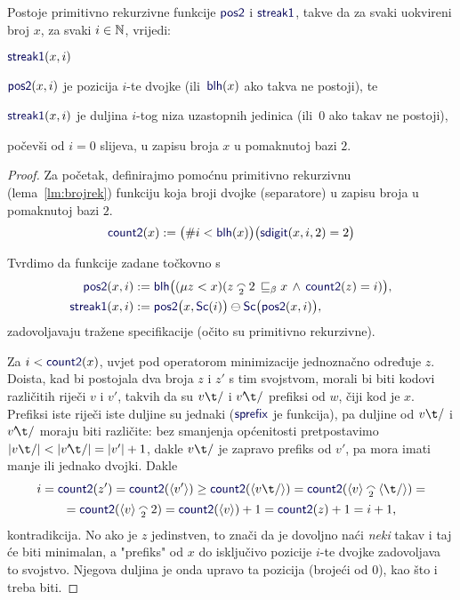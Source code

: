 \begin{lema}[{name=[primitivna rekurzivnost raščlambe binarnih zapisa]}]\label{lm:pos2streak1prn}
Postoje primitivno rekurzivne funkcije $\f{pos2}$ i $\f{streak1}$, takve da za svaki uokvireni broj $x$, za svaki $i\in{\mathbb N}$, vrijedi:
\begin{labeling}{$\f{streak1}(x,i)$}
    \item[$\f{pos2}(x,i)$] je pozicija $i$-te dvojke (ili\, $\f{blh}(x)$ ako takva ne postoji), te
    \item[$\f{streak1}(x,i)$] je duljina $i$-tog niza uzastopnih jedinica (ili\, $0$ ako takav ne postoji),
\end{labeling}
počevši od $i=0$ slijeva, u zapisu broja $x$ u pomaknutoj bazi $2$.
\end{lema}
\begin{proof}
Za početak, definirajmo pomoćnu primitivno rekurzivnu (lema~\ref{lm:brojrek}) funkciju koja broji dvojke (separatore) u zapisu broja u pomaknutoj bazi $2$.
\begin{equation}
    \f{count2}(x):=\bigl(\#i<\f{blh}(x)\bigr)\bigl(\f{sdigit}(x,i,2)=2\bigr)
\end{equation}

Tvrdimo da funkcije zadane točkovno s
\begin{align}
    \f{pos2}(x,i)&:=\f{blh}\bigl((\mu z<x)(z\conc22\,\sqsubseteq_\beta x\,\land\,\f{count2}(z)=i)\bigr),\\
    \f{streak1}(x,i)&:=\f{pos2}\bigl(x,\f{Sc}(i)\bigr)\ominus\f{Sc}\bigl(\f{pos2}(x,i)\bigr),
\end{align}
zadovoljavaju tražene specifikacije (očito su primitivno rekurzivne).

Za $i<\f{count2}(x)$, uvjet pod operatorom minimizacije jednoznačno određuje $z$. Doista, kad bi postojala dva broja $z$ i $z'$ s tim svojstvom, morali bi biti kodovi različitih riječi $v$ i $v'$, takvih da su $v\t/$ i $v'\!\t/$ prefiksi od $w$, čiji kod je $x$. Prefiksi iste riječi iste duljine su jednaki ($\f{sprefix}$ je funkcija), pa duljine od $v\t/$ i $v'\!\t/$ moraju biti različite: bez smanjenja općenitosti pretpostavimo $\dulj{v\t/}<\dulj{v'\!\t/}=\dulj{v'}+1$, dakle $v\t/$ je zapravo prefiks od $v'$, pa mora imati manje ili jednako dvojki. Dakle
\begin{multline}
    i=\f{count2}(z')=\f{count2}(\kr{v'})\ge\f{count2}(\kr{v\t/})=\f{count2}(\kr v\conc2\kr{\t/})=\\
    =\f{count2}(\kr v\conc22)=\f{count2}(\kr v)+1=\f{count2}(z)+1=i+1\text,
\end{multline}
kontradikcija. No ako je $z$ jedinstven, to znači da je dovoljno naći \emph{neki} takav i taj će biti minimalan, a "prefiks" od $x$ do isključivo pozicije $i$-te dvojke zadovoljava to svojstvo. Njegova duljina je onda upravo ta pozicija (brojeći od $0$), kao što i treba biti.


\end{proof}
